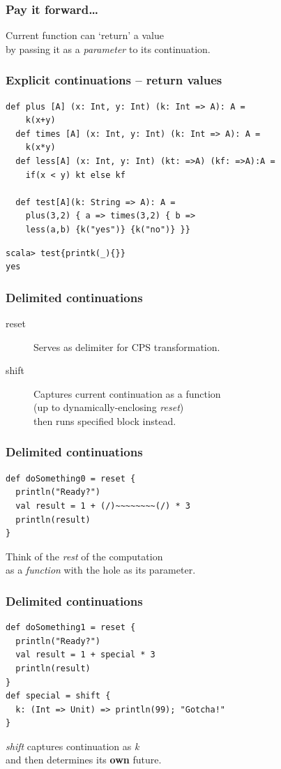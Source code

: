 \documentclass[14pt,t,usepdftitle=false,
xcolornames=x11names,svgnames,dvipsnames]{beamer}
\begin{document}
\begin{frame}
  \frametitle{Pay it forward\dots}
  Current function can `return' a value\\by passing it as a
  \textit{parameter} to its continuation.
\end{frame}

\begin{frame}[fragile]
  \frametitle{Explicit continuations -- return values}
\begin{lstlisting}[style=scala,moreemph={A}]
  def plus [A] (x: Int, y: Int) (k: Int => A): A =
    k(x+y)
  def times [A] (x: Int, y: Int) (k: Int => A): A =
    k(x*y)
  def less[A] (x: Int, y: Int) (kt: =>A) (kf: =>A):A =
    if(x < y) kt else kf

  def test[A](k: String => A): A =
    plus(3,2) { a => times(3,2) { b =>
    less(a,b) {k("yes")} {k("no")} }}
\end{lstlisting}
\begin{lstlisting}[style=scalarepl]
scala> test{printk(_){}}
yes
\end{lstlisting}
\end{frame}

\begin{frame}
  \frametitle{Delimited continuations}
  \bigskip
  \begin{description}
  \item[reset] Serves as delimiter for CPS transformation.\medskip
  \item[shift] Captures current continuation as a function\\
    (up to dynamically-enclosing \emph{reset})\\
    then runs specified block instead.
  \end{description}
\end{frame}

\begin{frame}[fragile]
  \frametitle{Delimited continuations}
\begin{lstlisting}[style=scala,emph={[2]reset}]
def doSomething0 = reset {
  println("Ready?")
  val result = 1 + (/)~~~~~~~~(/) * 3
  println(result)
}
\end{lstlisting}

  Think of the \emph{rest} of the computation\\as a \emph{function}
  with the hole as its parameter.
\end{frame}

\begin{frame}[fragile]
  \frametitle{Delimited continuations}
\begin{lstlisting}[style=scala,emph={[2]reset,shift}]
def doSomething1 = reset {
  println("Ready?")
  val result = 1 + special * 3
  println(result)
}
def special = shift {
  k: (Int => Unit) => println(99); "Gotcha!"
}
\end{lstlisting}
  \textit{shift} captures continuation as \textit{k}\\and then determines its
  \textbf{own} future.
\end{frame}
\end{document}
